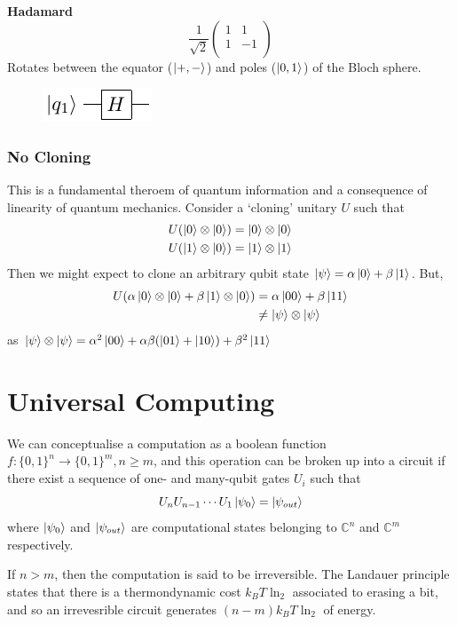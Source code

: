 \documentclass[11pt]{article}
\begin{document}
\textbf{Hadamard}
\[\frac{1}{\sqrt{2}}\begin{pmatrix}
1 & 1 \\
1 & -1 \\
\end{pmatrix}\]
Rotates between the equator ($\ket{+,-}$) and poles ($\ket{0,1}$) of the Bloch sphere.

\begin{figure}[!h]
    \centering
    \includegraphics[width=.2\textwidth]{Circuits/h.pdf}
\end{figure}

\subsubsection*{No Cloning}
This is a fundamental theroem of quantum information and a consequence of linearity of quantum mechanics.
Consider a `cloning' unitary $U$ such that
\begin{align}
    U(\ket{0}\otimes\ket{0}) &= \ket{0}\otimes\ket{0} \\
    U(\ket{1}\otimes\ket{0}) &= \ket{1}\otimes\ket{1} \\
\end{align}
Then we might expect to clone an arbitrary qubit state $\ket{\psi} = \alpha\ket{0} + \beta\ket{1}$. But,
\begin{align}
    U(\alpha\ket{0}\otimes\ket{0} + \beta\ket{1}\otimes\ket{0}) &= \alpha\ket{00} + \beta\ket{11}\\
    &\neq \ket{\psi}\otimes\ket{\psi}
\end{align}
as
$\ket{\psi}\otimes\ket{\psi} = \alpha^{2}\ket{00}+\alpha\beta(\ket{01}+\ket{10})+\beta^{2}\ket{11}$
\section{Universal Computing}

We can conceptualise a computation as a boolean function $f : \{0,1\}^{n} \rightarrow \{0,1\}^{m}, n\geq m$, and this operation can be broken up into a circuit if there exist a sequence of one- and many-qubit gates $U_{i}$ such that
\[U_{n}U_{n-1}\cdots U_{1}\ket{\psi_{0}} = \ket{\psi_{out}}\]
where $\ket{\psi_{0}}$ and $\ket{\psi_{out}}$ are computational states belonging to $\mathbb{C}^{n}$ and $\mathbb{C}^{m}$ respectively.

If $n > m$, then the computation is said to be irreversible. The Landauer principle states that there is a thermondynamic cost $k_{B}T \ln_{2}$ associated to erasing a bit, and so an irrevesrible circuit generates $(n-m)k_{B}T\ln_{2}$ of energy.
\end{document}
